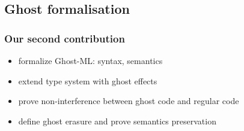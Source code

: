 \documentclass[xcolor=dvipsnames]{beamer}
\newcommand{\rouge}[1]{\textcolor{red}{#1}}
\newcommand{\bwedge}{\boldsymbol{~\wedge~}}
\newcommand{\bvee}{\boldsymbol{~\vee~}}
\newcommand{\gb}{\beta}
\newcommand{\gba}[1]{\beta_{#1}}
\newcommand{\gbt}{\top_\beta}
\newcommand{\gbr}{\textcolor{red}{\gb}}
\newcommand{\gbra}[1]{\textcolor{red}{\gba{#1}}}
\newcommand{\gbtr}{\textcolor{red}{\gbt}}
\newcommand{\gbran}[1]{\textcolor{red}{\neg\gba{#1}}}
\newcommand{\bth}{\bot_\theta}
\newcommand{\brh}{\bot_\rho}
\newcommand{\ghosttyping}[6]{\vdash_{gh}~#1~:~#2,~(#3,~#4,~\rouge{#5})~\textcolor{blue}{\boldsymbol{#6}}}
\begin{document}
\subsection*{Ghost formalisation}


\begin{frame}
\frametitle{Our second contribution}
\begin{itemize}
\item formalize {\red Ghost-ML}: syntax, semantics \pause
\item extend type system with {\red ghost effects} \pause
\item prove {\red non-interference} between ghost code and regular code \pause
\item define ghost {\red erasure} and prove {\red semantics preservation}
\end{itemize}
\end{frame}

%
%
%
\end{document}
